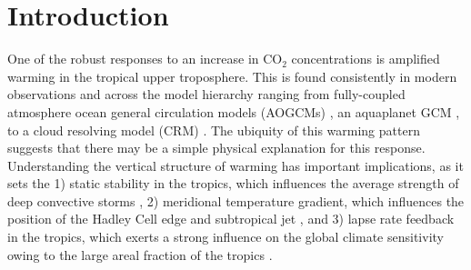 \documentclass{ametsocV5}
\begin{document}




\section{Introduction}
One of the robust responses to an increase in CO$_2$ concentrations is amplified warming in the tropical upper troposphere. This is found consistently in modern observations \citep{thorne-et-al-2010, flannaghan-et-al-2014} and across the model hierarchy ranging from fully-coupled atmosphere ocean general circulation models (AOGCMs) \citep{vallis-et-al-2015}, an aquaplanet GCM \citep{tan-et-al-2019}, to a cloud resolving model (CRM) \citep{romps-2011}. The ubiquity of this warming pattern suggests that there may be a simple physical explanation for this response. Understanding the vertical structure of warming has important implications, as it sets the 1) static stability in the tropics, which influences the average strength of deep convective storms \citep{seeley-romps-2015}, 2) meridional temperature gradient, which influences the position of the Hadley Cell edge and subtropical jet \citep{shaw-et-al-2016}, and 3) lapse rate feedback in the tropics, which exerts a strong influence on the global climate sensitivity owing to the large areal fraction of the tropics \citep{po-chedley-et-al-2018}.
\end{document}
